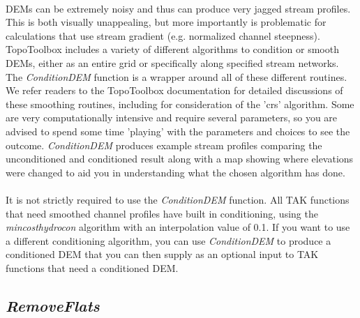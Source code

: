 \paragraph{}DEMs can be extremely noisy and thus can produce very jagged stream profiles. This is both visually unappealing, but more importantly is problematic for calculations that use stream gradient (e.g. normalized channel steepness). TopoToolbox includes a variety of different algorithms to condition or smooth DEMs, either as an entire grid or specifically along specified stream networks. The \textit{ConditionDEM} function is a wrapper around all of these different routines. We refer readers to the TopoToolbox documentation for detailed discussions of these smoothing routines, including \cite{Schwanghart2017} for consideration of the 'crs' algorithm. Some are very computationally intensive and require several parameters, so you are advised to spend some time 'playing' with the parameters and choices to see the outcome. \textit{ConditionDEM} produces example stream profiles comparing the unconditioned and conditioned result along with a map showing where elevations were changed to aid you in understanding what the chosen algorithm has done. 

\paragraph{}It is not strictly required to use the \textit{ConditionDEM} function. All TAK functions that need smoothed channel profiles have built in conditioning, using the \textit{mincosthydrocon} algorithm with an interpolation value of 0.1. If you want to use a different conditioning algorithm, you can use \textit{ConditionDEM} to produce a conditioned DEM that you can then supply as an optional input to TAK functions that need a conditioned DEM.

\subsection{\textit{RemoveFlats}}

